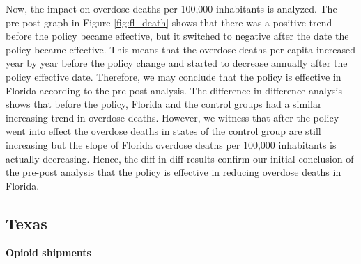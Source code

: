 \documentclass[12pt,letterpaper]{article}
\begin{document}
Now, the impact on overdose deaths per 100,000 inhabitants is analyzed. The pre-post graph in Figure \ref{fig:fl_death} shows that there was a positive trend before the policy became effective, but it switched to negative after the date the policy became effective. This means that the overdose deaths per capita increased year by year before the policy change and started to decrease annually after the policy effective date. Therefore, we may conclude that the policy is effective in Florida according to the pre-post analysis. The difference-in-difference analysis shows that before the policy, Florida and the control groups had a similar increasing trend in overdose deaths. However, we witness that after the policy went into effect the overdose deaths in states of the control group are still increasing but the slope of Florida overdose deaths per 100,000 inhabitants is actually decreasing. Hence, the diff-in-diff results confirm our initial conclusion of the pre-post analysis that the policy is effective in reducing overdose deaths in Florida.

\subsection{Texas}
\textbf{Opioid shipments}
\end{document}

